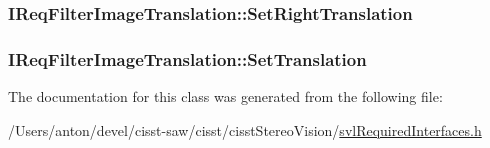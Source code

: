 \subsubsection[{Set\+Right\+Translation}]{ I\+Req\+Filter\+Image\+Translation\+::\+Set\+Right\+Translation}\label{class_i_req_filter_image_translation_a6fcebfa71603497d6dfc6079ffcd2a64}
\hypertarget{class_i_req_filter_image_translation_aa40f24911962a87d74a797d9e24ad16a}{}
\subsubsection[{Set\+Translation}]{ I\+Req\+Filter\+Image\+Translation\+::\+Set\+Translation}\label{class_i_req_filter_image_translation_aa40f24911962a87d74a797d9e24ad16a}


The documentation for this class was generated from the following file\+:\begin{DoxyCompactItemize}
\item 
/\+Users/anton/devel/cisst-\/saw/cisst/cisst\+Stereo\+Vision/\hyperlink{svl_required_interfaces_8h}{svl\+Required\+Interfaces.\+h}\end{DoxyCompactItemize}
